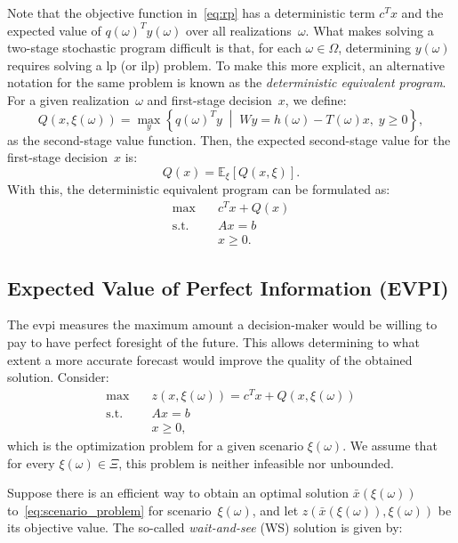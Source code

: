 Note that the objective function in~\eqref{eq:rp} has a deterministic term
$c^{T}x$ and the expected value of $q(\omega)^{T} y(\omega)$ over all
realizations~$\omega$. What makes solving a two-stage stochastic program
difficult is that, for each $\omega \in \Omega$, determining $y(\omega)$
requires solving a \gls{lp} (or \gls{ilp}) problem. To make this more explicit,
an alternative notation for the same problem is known as the \emph{deterministic
	equivalent program}. For a given realization~$\omega$ and first-stage
decision~$x$, we define:
\[
	Q(x, \xi(\omega)) = \max_{y} \left\{ q(\omega)^{T} y \; \middle| \; W y = h(\omega) - T(\omega) x, \; y \geq 0 \right\},
\]
as the second-stage value function. Then, the expected second-stage value for
the first-stage decision~$x$ is:
\[
	Q(x) = \mathbb{E}_{\xi} \left[ Q(x, \xi) \right].
\]
With this, the deterministic equivalent program can be formulated as:
\begin{align}
	\max \quad        & c^{T} x + Q(x) \nonumber \\
	\text{s.t.} \quad & A x = b \nonumber        \\
	                  & x \geq 0.
	\label{eq:rp_det}
\end{align}

\subsection{Expected Value of Perfect Information (EVPI)}

The \gls{evpi} measures the maximum amount a decision-maker would be willing to
pay to have perfect foresight of the future. This allows determining to what
extent a more accurate forecast would improve the quality of the obtained
solution. Consider:
\begin{align}
	\max \quad        & z(x, \xi(\omega)) = c^{T} x + Q(x, \xi(\omega)) \nonumber \\
	\text{s.t.} \quad & A x = b \nonumber                                         \\
	                  & x \geq 0,
	\label{eq:scenario_problem}
\end{align}
which is the optimization problem for a given scenario $\xi(\omega)$. We assume
that for every $\xi(\omega) \in \Xi$, this problem is neither infeasible nor
unbounded.

Suppose there is an efficient way to obtain an optimal solution
$\bar{x}(\xi(\omega))$ to~\eqref{eq:scenario_problem} for
scenario~$\xi(\omega)$, and let $z(\bar{x}(\xi(\omega)), \xi(\omega))$ be its
objective value. The so-called \emph{wait-and-see} (WS) solution is given by:

